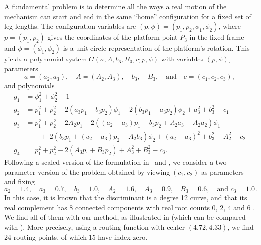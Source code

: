 \documentclass[11pt]{article}
\numberwithin{equation}{section}
\theoremstyle{plain}
\theoremstyle{definition}
\theoremstyle{remark}
\begin{document}
A fundamental problem is to determine all the ways a real motion of the mechanism can start and end in the same ``home'' configuration for a fixed set of leg lengths. The configuration variables are $(p,\phi) = (p_{1},p_{2},\phi_{1},\phi_{2})$, where $p = (p_{1},p_{2})$ gives the coordinates of the platform point $P_{3}$ in the fixed frame and $\phi = (\phi_{1},\phi_{2})$ is a unit circle representation of the platform's rotation. This yields a polynomial system $G(a,A,b_{3},B_3,c;p,\phi)$ with variables $(p,\phi)$, parameters 
\begin{equation*}
a = (a_{2},a_{3}), \quad A=(A_{2},A_{3}), \quad b_{3}, \quad B_{3}, \quad \text{and} \quad c=(c_{1},c_{2},c_{3}),
\end{equation*}
and polynomials
\begin{align*}
g_1 & = \phi_1^2 + \phi_2^2 - 1\\
g_2 & = p_1^2 + p_2^2 - 2(a_3p_1 + b_3p_2)\phi_1 + 2(b_3p_1 - a_3p_2)\phi_2 + a_3^2 + b_3^2 - c_1\\
g_3 & = p_1^2 + p_2^2 - 2A_2p_1 +
2((a_2-a_3)p_1 - b_3p_2 + A_2a_3 - A_2a_2)\phi_1 \\
&\qquad +~2(b_3p_1 + (a_2-a_3)p_2 - A_2b_3)\phi_2
+ (a_2-a_3)^2 + b_3^2 + A_2^2 - c_2\\
g_4 &= p_1^2 + p_2^2 - 2(A_3 p_1 + B_3 p_2) + A_3^2 + B_3^2 - c_3.
\end{align*}
Following a scaled version of the formulation in~\cite{husty} and \cite[Section~4]{RealMonodromy}, we consider a two-parameter version of the problem obtained by viewing $(c_1,c_2)$ as parameters and fixing
\begin{equation}
\label{eq:3RPR_fixed_parmaters}
a_2 = 1.4,\quad a_3 = 0.7,\quad  b_3 = 1.0,\quad  A_2 = 1.6,\quad A_3 = 0.9,\quad B_3 = 0.6,\quad \text{and } c_3 = 1.0\,.
\end{equation}
In this case, it is known that the discriminant is a degree 12 curve, and that its real complement has 8 connected components with real root counts 0, 2, 4 and 6 \cite[Section~4]{RealMonodromy}. We find all of them with our method, as illustrated in  (which can be compared with \cite[Fig.~8]{RealMonodromy}). More precisely, using a routing function with center $(4.72, 4.33)$, we find 24 routing points, of which 15 have index zero.
\end{document}
